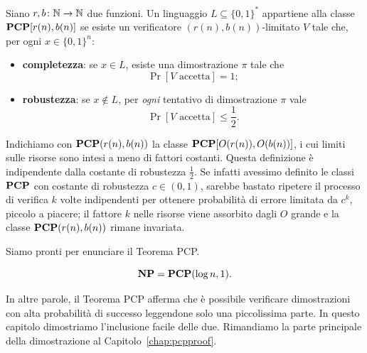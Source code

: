 \begin{definition}
	Siano $r, b\colon \mathbb{N} \to \mathbb{N}$ due funzioni. Un linguaggio $L \subseteq \{0,1\}^*$
	appartiene alla classe $\mathbf{PCP}[r(n), b(n)]$ se esiste un verificatore
	$(r(n), b(n))$-limitato $V$ tale che, per ogni $x \in \{0,1\}^n$:
	\begin{itemize}
		\item \textbf{completezza}: se $x \in L$, esiste una
			dimostrazione $\pi$ tale che
		\[
			\Pr[V \text{ accetta}] = 1;
		\]
		\item \textbf{robustezza}: se $x \notin L$, per \emph{ogni}
			tentativo di dimostrazione $\pi$ vale
		\[
			\Pr[V \text{ accetta}] \le \frac12.
		\]
	\end{itemize}
	Indichiamo con $\mathbf{PCP}(r(n), b(n))$ la classe $\mathbf{PCP}[O(r(n)), O(b(n))]$, i cui
	limiti sulle risorse sono intesi a meno di fattori costanti. Questa
	definizione è indipendente dalla costante di robustezza $\frac12$. Se
	infatti avessimo definito le classi $\mathbf{PCP}$ con costante di robustezza
	$c \in (0, 1)$, sarebbe bastato ripetere il processo di verifica $k$ volte
	indipendenti per ottenere probabilità di errore limitata da $c^k$, piccolo a
	piacere; il fattore $k$ nelle risorse viene assorbito dagli $O$ grande e
	la classe $\mathbf{PCP}(r(n), b(n))$ rimane invariata.
\end{definition}

Siamo pronti per enunciare il Teorema PCP.

\begin{theorem} \label{thm:pcp}
	\[
		\mathbf{NP} = \mathbf{PCP}(\log n, 1).
	\]
\end{theorem}

In altre parole, il Teorema PCP afferma che è possibile verificare
dimostrazioni con alta probabilità di successo leggendone solo una
piccolissima parte.
In questo capitolo dimostriamo l'inclusione facile delle due. Rimandiamo
la parte principale della dimostrazione al Capitolo~\ref{chap:pcpproof}.

